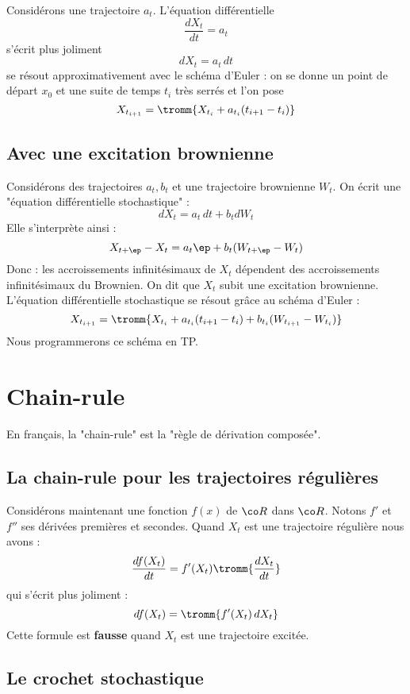 \documentclass{article}
\begin{document}
Considérons une trajectoire $a_t$.  L'équation différentielle
 $$
   \frac {dX_t}{dt}   =a_t  
  $$
 s'écrit plus joliment
 $$
 dX_t = a_t \, dt
 $$
se résout approximativement avec le schéma d'Euler : on se donne un point de départ $x_0$ et une suite de temps $t_i$ très serrés et l'on pose 
$$
X_{t_{i+1}} =   \tromm{X_{t_i} +    a_{t_i} (t_{i+1} -t_i) }
$$


\subsection{Avec une excitation brownienne}

Considérons des trajectoires $a_t,b_t$ et une trajectoire brownienne $W_t$.  On écrit une "équation différentielle stochastique" :
$$
 dX_t = a_t \, dt + b_t dW_t 
 $$
Elle s'interprète ainsi :  
$$
X_{t+ \ep } -X_t = a_t \ep + b_t (W_{t+\ep}-W_t) 
$$
Donc : les accroissements infinitésimaux de $X_t$ dépendent des accroissements infinitésimaux du Brownien. On dit que $X_t$ subit une excitation brownienne.  L'équation différentielle stochastique se résout grâce au schéma d'Euler :
$$
X_{t_{i+1}} =  \tromm{X_{t_i} +    a_{t_i} (t_{i+1} -t_i)   + b_{t_i} (W_{t_{i+1}}- W_{t_i}) }
$$
Nous  programmerons ce schéma en TP. 


 
\section{Chain-rule}

En français, la "chain-rule" est la "règle de dérivation composée".

\subsection{La chain-rule pour les trajectoires régulières}

Considérons maintenant une fonction $f(x)$ de  $\co R$ dans $\co R$.  Notons $f'$ et $f''$ ses dérivées premières et secondes.
Quand $X_t$ est une trajectoire régulière nous avons : 
$$
\frac {d f(X_t)}{dt} = f'(X_t)    \tromm{   \frac{dX_t}{dt} }
$$
qui s'écrit plus joliment :  
$$
d f(X_t) =\tromm{ f'(X_t) \, dX_t }
$$
Cette formule est {\bf fausse} quand $X_t$ est une trajectoire excitée.


\subsection{Le crochet stochastique}
\end{document}
